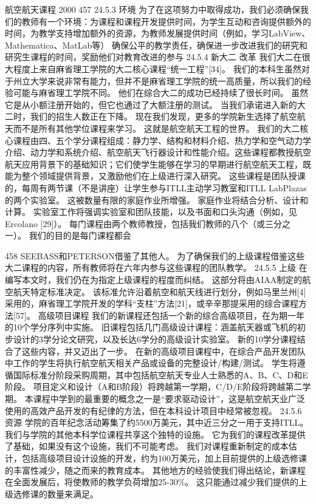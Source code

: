 \documentclass[UTF8,11pt,a4paper,openany,fontset=fandol]{ctexbook}
\begin{document}
航空航天课程 2000 457 24.5.3 环境 为了在这项努力中取得成功，我们必须确保我们的教师有一个环境：为课程和课程开发提供时间，为学生互动和咨询提供额外的时间，为教学支持增加额外的资源，为教师发展提供时间（例如，学习LabView、Mathematica、MatLab等） 确保公平的教学责任，确保进一步改进我们的研究和研究生课程的时间，奖励他们对教育改进的参与 24.5.4 新大二 改革 我们大二在很大程度上来自麻省理工学院的大二核心课程“统一工程”[34]。 我们的本科生虽然对于州立大学来说非常有能力，但并不是麻省理工学院的统一高质量，所以我们的经验可能与麻省理工学院不同。 他们在综合大二的成功已经持续了很长时间。 虽然它是从小额注册开始的，但它也通过了大额注册的测试。 当我们承诺进入新的大二时，我们的招生人数正在下降。 现在我们发现，更多的学院新生选择了航空航天而不是所有其他学位课程来学习。 这就是航空航天工程的世界。 我们的大二核心课程由四、五个学分课程组成：静力学、结构和材料介绍、热力学和空气动力学介绍、动力学和系统介绍、航空航天飞行器设计和性能介绍。这些课程都教授航空航天应用背景下的基础知识；它们使学生能够在学习的早期进行航空航天工程，既能为整个领域提供背景，又激励他们在上级进行深入研究。 这些课程是团队授课的，每周有两节课（不是讲座）让学生参与ITLL主动学习教室和ITLL LabPlazas的两个实验室。 这被数量有限的家庭作业所增强。 家庭作业将结合分析、设计和计算。 实验室工作将强调实验室和团队技能，以及书面和口头沟通（例如，见Ercolano [29]）。 每门课程由两个教师教授，包括我们教师的八个（或三分之一）。 我们的目的是每门课程都会

458 SEEBASS和PETERSON借鉴了其他人。 为了确保我们的上级课程借鉴这些大二课程的内容，所有教师将在六年内参与这些课程的团队教学。 24.5.5 上级 在编写本文时，我们仍在为指定上级课程的程度而纠结。 这部分将由AIAA制定的航空航天特定标准决定。 该标准允许沿着航空和航天线进行划分，例如马里兰州[4]采用的，麻省理工学院开发的学科“支柱”方法[21]，或辛辛那提采用的综合课程方法[57]。 高级项目课程 我们的新课程还包括一个新的综合高级项目，在为期一年的10个学分序列中实施。 旧课程包括几门高级设计课程：涵盖航天器或飞机的初步设计的3学分论文研究，以及长达6学分的高级设计实验室。 新的10学分课程结合了这些内容，并又迈出了一步。 在新的高级项目课程中，在综合产品开发团队中工作的学生将执行航空航天相关产品或设备的完整设计/构建/测试。 学生将遵循国际标准分阶段采购周期，其中包括航空航天专业人士熟悉的A、B、C、D和E阶段。 项目定义和设计（A和B阶段）将跨越第一学期，C/D/E阶段将跨越第二学期。 本课程中学到的最重要的概念之一是“要求驱动设计”，这是航空航天业广泛使用的高效产品开发的有纪律的方法，但在本科设计项目中经常被忽视。 24.5.6 资源 学院的百年纪念活动筹集了约5500万美元，其中近三分之一用于支持ITLL。 我们与学院的其他本科学位课程共享这个独特的设施。 它为我们的课程改革提供了基础，如果没有这个设施，我们不可能考虑。 我们对课程重新制定的成本估计，包括高级项目设计设施的开发，约为100万美元，加上目前提供的上级选修课的丰富性减少，随之而来的教育成本。 其他地方的经验使我们得出结论，新课程在全面发展后，将使教师的教学负荷增加25-30\%。 这只能通过减少我们提供的上级选修课的数量来满足。
\end{document}
